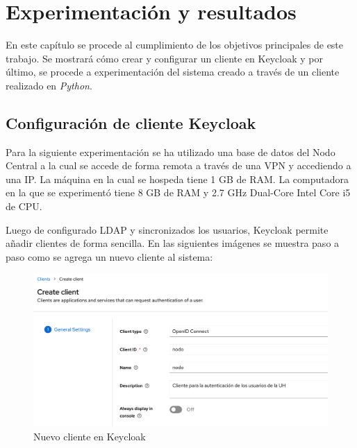 \chapter{Experimentación y resultados}\label{chapter:experimentation}

En este capítulo se procede al cumplimiento de los objetivos principales de este trabajo. Se mostrará cómo crear y configurar un cliente en Keycloak y por último, se procede a experimentación del sistema creado a través de un cliente realizado en \textit{Python}.

\section{Configuración de cliente Keycloak} \label{config-client}
 
%
%

Para la siguiente experimentación se ha utilizado una base de datos del Nodo Central a la cual se accede de forma remota a través de una VPN y accediendo a una IP. La máquina en la cual se hospeda tiene 1 GB de RAM. La computadora en la que se experimentó tiene  8 GB de RAM y 2.7 GHz Dual-Core Intel Core i5 de CPU.

 Luego de configurado LDAP y sincronizados los usuarios, Keycloak permite añadir clientes de forma sencilla. En las siguientes imágenes se muestra paso a paso como se agrega un nuevo cliente al sistema:

\begin{figure}[H]
	\centering
	\includegraphics[width=1\linewidth]{Graphics/client_new1}
	\caption{Nuevo cliente en Keycloak}
	\label{fig:clientnew1}
\end{figure}

